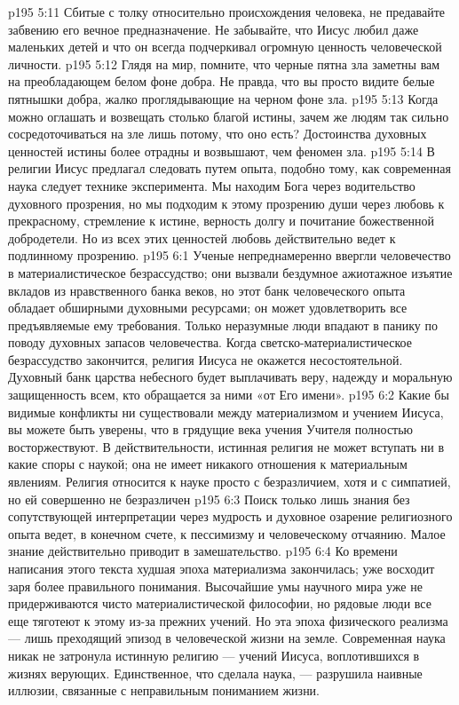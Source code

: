 \vs p195 5:11 \pc Сбитые с толку относительно происхождения человека, не предавайте забвению его вечное предназначение. Не забывайте, что Иисус любил даже маленьких детей и что он всегда подчеркивал огромную ценность человеческой личности.
\vs p195 5:12 \pc Глядя на мир, помните, что черные пятна зла заметны вам на преобладающем белом фоне добра. Не правда, что вы просто видите белые пятнышки добра, жалко проглядывающие на черном фоне зла.
\vs p195 5:13 Когда можно оглашать и возвещать столько благой истины, зачем же людям так сильно сосредоточиваться на зле лишь потому, что оно есть? Достоинства духовных ценностей истины более отрадны и возвышают, чем феномен зла.
\vs p195 5:14 \pc В религии Иисус предлагал следовать путем опыта, подобно тому, как современная наука следует технике эксперимента. Мы находим Бога через водительство духовного прозрения, но мы подходим к этому прозрению души через любовь к прекрасному, стремление к истине, верность долгу и почитание божественной добродетели. Но из всех этих ценностей любовь действительно ведет к подлинному прозрению.
\vs p195 6:1 Ученые непреднамеренно ввергли человечество в материалистическое безрассудство; они вызвали бездумное ажиотажное изъятие вкладов из нравственного банка веков, но этот банк человеческого опыта обладает обширными духовными ресурсами; он может удовлетворить все предъявляемые ему требования. Только неразумные люди впадают в панику по поводу духовных запасов человечества. Когда светско\hyp{}материалистическое безрассудство закончится, религия Иисуса не окажется несостоятельной. Духовный банк царства небесного будет выплачивать веру, надежду и моральную защищенность всем, кто обращается за ними «от Его имени».
\vs p195 6:2 Какие бы видимые конфликты ни существовали между материализмом и учением Иисуса, вы можете быть уверены, что в грядущие века учения Учителя полностью восторжествуют. В действительности, истинная религия не может вступать ни в какие споры с наукой; она не имеет никакого отношения к материальным явлениям. Религия относится к науке просто с безразличием, хотя и с симпатией, но ей совершенно не безразличен 
\vs p195 6:3 Поиск только лишь знания без сопутствующей интерпретации через мудрость и духовное озарение религиозного опыта ведет, в конечном счете, к пессимизму и человеческому отчаянию. Малое знание действительно приводит в замешательство.
\vs p195 6:4 Ко времени написания этого текста худшая эпоха материализма закончилась; уже восходит заря более правильного понимания. Высочайшие умы научного мира уже не придерживаются чисто материалистической философии, но рядовые люди все еще тяготеют к этому из\hyp{}за прежних учений. Но эта эпоха физического реализма --- лишь преходящий эпизод в человеческой жизни на земле. Современная наука никак не затронула истинную религию --- учений Иисуса, воплотившихся в жизнях верующих. Единственное, что сделала наука, --- разрушила наивные иллюзии, связанные с неправильным пониманием жизни.
